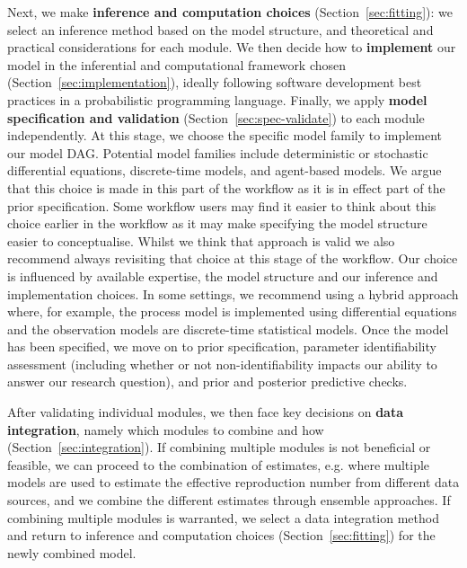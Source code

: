 \documentclass{article}
\begin{document}
Next, we make \textbf{inference and computation choices} (Section~\ref{sec:fitting}): we select an inference method based on the model structure, and theoretical and practical considerations for each module.
We then decide how to \textbf{implement} our model in the inferential and computational framework chosen (Section~\ref{sec:implementation}), ideally following software development best practices in a probabilistic programming language.
Finally, we apply \textbf{model specification and validation} (Section~\ref{sec:spec-validate}) to each module independently. At this stage, we choose the specific model family to implement our model DAG. Potential model families include deterministic or stochastic differential equations, discrete-time models, and agent-based models.
We argue that this choice is made in this part of the workflow as it is in effect part of the prior specification.
Some workflow users may find it easier to think about this choice earlier in the workflow as it may make specifying the model structure easier to conceptualise.
Whilst we think that approach is valid we also recommend always revisiting that choice at this stage of the workflow.
Our choice is influenced by available expertise, the model structure and our inference and implementation choices. 
In some settings, we recommend using a hybrid approach where, for example, the process model is implemented using differential equations and the observation models are discrete-time statistical models.
Once the model has been specified, we move on to prior specification, parameter identifiability assessment (including whether or not non-identifiability impacts our ability to answer our research question), and prior and posterior predictive checks.

After validating individual modules, we then face key decisions on \textbf{data integration}, namely which modules to combine and how  (Section~\ref{sec:integration}). If combining multiple modules is not beneficial or feasible, we can proceed to the combination of estimates, e.g. where multiple models are used to estimate the effective reproduction number from different data sources, and we combine the different estimates through ensemble approaches. If combining multiple modules is warranted, we select a data integration method and return to inference and computation choices (Section~\ref{sec:fitting}) for the newly combined model.
\end{document}
